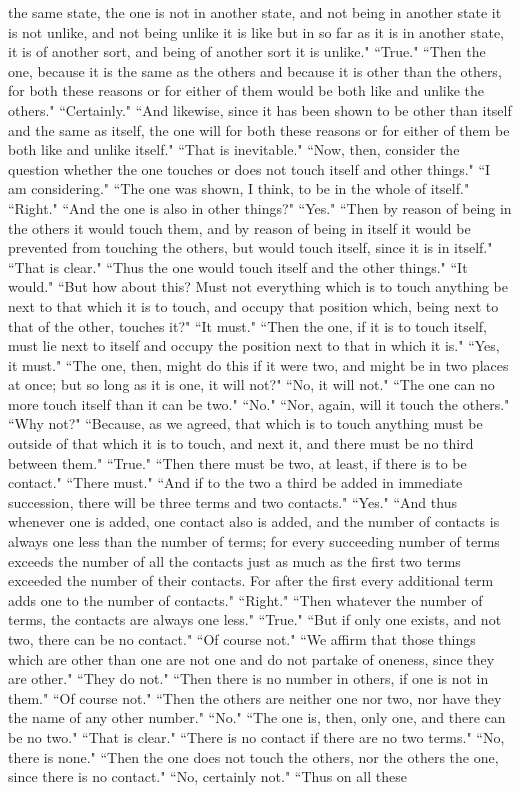 \documentclass[letterpaper,12pt]{article}
\newcommand{\stephpag}[1]{\marginnote{\small\itshape\fontfamily{ppl}\selectfont #1}}
\begin{document}
the same state, the one is not in another state, and not being in another state it is not unlike, and not being unlike it is like but in so far as it is in another state, it is of another sort, and being of another sort it is unlike." ``True." ``Then the one, because it is the same as the others and because it is other than the others, for both these reasons or for either of them would be both like and unlike the others." \stephpag{d} ``Certainly." ``And likewise, since it has been shown to be other than itself and the same as itself, the one will for both these reasons or for either of them be both like and unlike itself." ``That is inevitable." ``Now, then, consider the question whether the one touches or does not touch itself and other things." ``I am considering." ``The one was shown, I think, to be in the whole of itself." ``Right." ``And the one is also in other things?" ``Yes." ``Then by reason of being in the others \stephpag{e} it would touch them, and by reason of being in itself it would be prevented from touching the others, but would touch itself, since it is in itself." ``That is clear." ``Thus the one would touch itself and the other things." ``It would." ``But how about this? Must not everything which is to touch anything be next to that which it is to touch, and occupy that position which, being next to that of the other, touches it?" ``It must." ``Then the one, if it is to touch itself, must lie next to itself and occupy the position next to that in which it is." ``Yes, it must." \stephpag{149 a} ``The one, then, might do this if it were two, and might be in two places at once; but so long as it is one, it will not?" ``No, it will not." ``The one can no more touch itself than it can be two." ``No." ``Nor, again, will it touch the others." ``Why not?" ``Because, as we agreed, that which is to touch anything must be outside of that which it is to touch, and next it, and there must be no third between them." ``True." ``Then there must be two, at least, if there is to be contact." ``There must." ``And if \stephpag{b} to the two a third be added in immediate succession, there will be three terms and two contacts." ``Yes." ``And thus whenever one is added, one contact also is added, and the number of contacts is always one less than the number of terms; for every succeeding number of terms exceeds the number of all the contacts just as much as the first two terms exceeded the number of their contacts. \stephpag{c} For after the first every additional term adds one to the number of contacts." ``Right." ``Then whatever the number of terms, the contacts are always one less." ``True." ``But if only one exists, and not two, there can be no contact." ``Of course not." ``We affirm that those things which are other than one are not one and do not partake of oneness, since they are other." ``They do not." ``Then there is no number in others, if one is not in them." ``Of course not." ``Then the others are neither one nor two, \stephpag{d} nor have they the name of any other number." ``No." ``The one is, then, only one, and there can be no two." ``That is clear." ``There is no contact if there are no two terms." ``No, there is none." ``Then the one does not touch the others, nor the others the one, since there is no contact." ``No, certainly not." ``Thus on all these 
\end{document}
